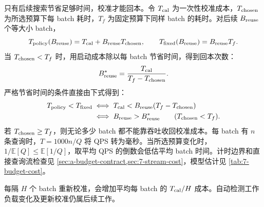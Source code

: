 只有后续搜索节省足够时间，校准才能回本。令 $T_{\rm cal}$ 为一次性校准成本，$T_{\rm chosen}$ 为所选预算下每 batch 耗时，$T_f$ 为固定预算下同样 batch 的耗时。对后续 $B_{\rm reuse}$ 个等大小 batch，
\begin{equation}
 T_{\rm policy}(B_{\rm reuse})=T_{\rm cal}+B_{\rm reuse}T_{\rm chosen},\qquad
 T_{\rm fixed}(B_{\rm reuse})=B_{\rm reuse}T_f.
 \label{eq:6-total-cost}
\end{equation}
当 $T_{\rm chosen}<T_f$ 时，用启动成本除以每 batch 节省时间，得到回本次数：
\begin{equation}
 B_{\rm reuse}^*=\frac{T_{\rm cal}}{T_f-T_{\rm chosen}}.
 \label{eq:6-payback}
\end{equation}
严格节省时间的条件直接由下式得到：
\[
 \begin{aligned}
 T_{\rm policy}<T_{\rm fixed}
 &\iff T_{\rm cal}<B_{\rm reuse}(T_f-T_{\rm chosen})\\
 &\iff B_{\rm reuse}>B_{\rm reuse}^*
 \qquad(T_{\rm chosen}<T_f).
 \end{aligned}
\]
若 $T_{\rm chosen}\geq T_f$，则无论多少 batch 都不能靠吞吐收回校准成本。每 batch 有 $n$ 条查询时，$T=1000n/Q$ 将 QPS 转为毫秒。当所选预算变化时，$1/\mathbb E[Q]\leq\mathbb E[1/Q]$，取平均 QPS 的倒数会低估平均 batch 时间。计时边界和直接查询流检查见 \cref{sec:a-budget-contract,sec:7-stream-cost}，模型估计见 \cref{tab:7-budget-cost}。

每隔 $H$ 个 batch 重新校准，会增加平均每 batch 的 $T_{\rm cal}/H$ 成本。自动检测工作负载变化及更新校准仍属后续工作。
